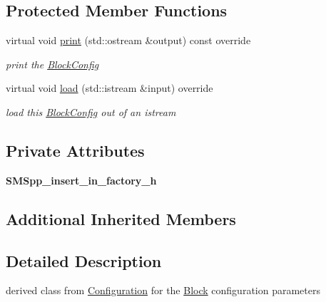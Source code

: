 \subsection*{Protected Member Functions}
\begin{DoxyCompactItemize}
\item 
\mbox{\label{class_s_m_spp__di__unipi__it_1_1_block_config_a59a9fcbf8f9f86d348344b2073644b0e}} 
virtual void \mbox{\hyperlink{class_s_m_spp__di__unipi__it_1_1_block_config_a59a9fcbf8f9f86d348344b2073644b0e}{print}} (std\+::ostream \&output) const override
\begin{DoxyCompactList}\small\item\em print the \mbox{\hyperlink{class_s_m_spp__di__unipi__it_1_1_block_config}{Block\+Config}} \end{DoxyCompactList}\item 
virtual void \mbox{\hyperlink{class_s_m_spp__di__unipi__it_1_1_block_config_a019850055afe817b816bae5699f461d3}{load}} (std\+::istream \&input) override
\begin{DoxyCompactList}\small\item\em load this \mbox{\hyperlink{class_s_m_spp__di__unipi__it_1_1_block_config}{Block\+Config}} out of an istream \end{DoxyCompactList}\end{DoxyCompactItemize}
\subsection*{Private Attributes}
\begin{DoxyCompactItemize}
\item 
\mbox{\label{class_s_m_spp__di__unipi__it_1_1_block_config_a5618a1c2a09ff7cd62e4de9df7956672}} 
{\bfseries S\+M\+Spp\+\_\+insert\+\_\+in\+\_\+factory\+\_\+h}
\end{DoxyCompactItemize}
\subsection*{Additional Inherited Members}


\subsection{Detailed Description}
derived class from \mbox{\hyperlink{class_s_m_spp__di__unipi__it_1_1_configuration}{Configuration}} for the \mbox{\hyperlink{class_s_m_spp__di__unipi__it_1_1_block}{Block}} configuration parameters 

